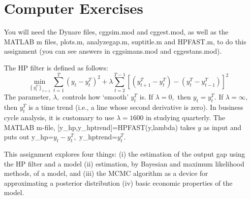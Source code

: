 \section{Computer Exercises}

You will need the Dynare files, cggsim.mod and cggest.mod, as well as the
MATLAB m files, plots.m, analyzegap.m, suptitle.m and HPFAST.m, to do this
assignment (you can see answers in cggsimans.mod and cggestans.mod).

The HP filter is defined as follows:%
\[
\min_{\left\{ y_{t}^{T}\right\} _{t=1}}\sum_{t=1}^{T}\left(
y_{t}-y_{t}^{T}\right) ^{2}+\lambda \sum_{t=2}^{T-1}\left[ \left(
y_{t+1}^{T}-y_{t}^{T}\right) -\left( y_{t}^{T}-y_{t-1}^{T}\right) \right]
^{2} 
\]%
The parameter, $\lambda ,$ controls how `smooth' $y_{t}^{T}$ is. If $\lambda
=0,$ then $y_{t}=y_{t}^{T}.$ If $\lambda =\infty ,$ then $y_{t}^{T}$ is a
time trend (i.e., a line whose second derivative is zero). In business cycle
analysis, it is customary to use $\lambda =1600$ in studying quarterly. The
MATLAB m-file, [y\_hp,y\_hptrend]=HPFAST(y,lambda) takes $y$ as input and
puts out y\_hp=$y_{t}-y_{t}^{T},$ y\_hptrend=$y_{t}^{T}.$

This assignment explores four things: (i) the estimation of the output gap
using the HP filter and a model (ii) estimation, by Bayesian and maximum
likelihood methods, of a model, and (iii) the MCMC algorithm as a device for
approximating a posterior distribution (iv) basic economic properties of the
model.

